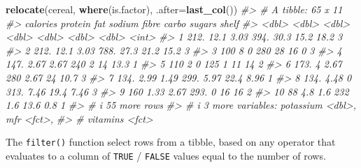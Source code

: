 \documentclass[
]{book}
\newenvironment{Shaded}{\begin{snugshade}}{\end{snugshade}}
\newcommand{\AttributeTok}[1]{\textcolor[rgb]{0.13,0.29,0.53}{#1}}
\newcommand{\CommentTok}[1]{\textcolor[rgb]{0.56,0.35,0.01}{\textit{#1}}}
\newcommand{\FunctionTok}[1]{\textcolor[rgb]{0.13,0.29,0.53}{\textbf{#1}}}
\newcommand{\NormalTok}[1]{#1}
\begin{document}
\begin{Shaded}
\begin{Highlighting}[]
\FunctionTok{relocate}\NormalTok{(cereal, }\FunctionTok{where}\NormalTok{(is.factor), }\AttributeTok{.after=}\FunctionTok{last\_col}\NormalTok{())}
\CommentTok{\#\textgreater{} \# A tibble: 65 x 11}
\CommentTok{\#\textgreater{}    calories protein   fat sodium fibre carbo sugars shelf}
\CommentTok{\#\textgreater{}       \textless{}dbl\textgreater{}   \textless{}dbl\textgreater{} \textless{}dbl\textgreater{}  \textless{}dbl\textgreater{} \textless{}dbl\textgreater{} \textless{}dbl\textgreater{}  \textless{}dbl\textgreater{} \textless{}int\textgreater{}}
\CommentTok{\#\textgreater{}  1     212.   12.1   3.03   394. 30.3   15.2  18.2      3}
\CommentTok{\#\textgreater{}  2     212.   12.1   3.03   788. 27.3   21.2  15.2      3}
\CommentTok{\#\textgreater{}  3     100     8     0      280  28     16     0        3}
\CommentTok{\#\textgreater{}  4     147.    2.67  2.67   240   2     14    13.3      1}
\CommentTok{\#\textgreater{}  5     110     2     0      125   1     11    14        2}
\CommentTok{\#\textgreater{}  6     173.    4     2.67   280   2.67  24    10.7      3}
\CommentTok{\#\textgreater{}  7     134.    2.99  1.49   299.  5.97  22.4   8.96     1}
\CommentTok{\#\textgreater{}  8     134.    4.48  0      313.  7.46  19.4   7.46     3}
\CommentTok{\#\textgreater{}  9     160     1.33  2.67   293.  0     16    16        2}
\CommentTok{\#\textgreater{} 10      88     4.8   1.6    232   1.6   13.6   0.8      1}
\CommentTok{\#\textgreater{} \# i 55 more rows}
\CommentTok{\#\textgreater{} \# i 3 more variables: potassium \textless{}dbl\textgreater{}, mfr \textless{}fct\textgreater{},}
\CommentTok{\#\textgreater{} \#   vitamins \textless{}fct\textgreater{}}
\end{Highlighting}
\end{Shaded}

The \texttt{filter()} function select rows from a tibble, based on any operator that evaluates to a column of \texttt{TRUE} / \texttt{FALSE} values equal to the number of rows.
\end{document}
